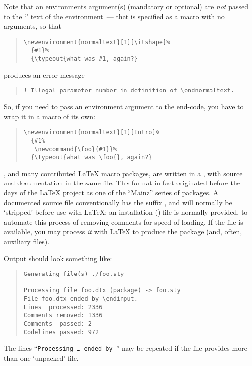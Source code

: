 Note that an environments argument(s) (mandatory or optional) are
\emph{not} passed to the `' text of the environment~--- that
is specified as a macro with no arguments, so that
\begin{quote}
\begin{verbatim}
\newenvironment{normaltext}[1][\itshape]%
  {#1}%
  {\typeout{what was #1, again?}
\end{verbatim}
\end{quote}
produces an error message
\begin{quote}
\begin{verbatim}
! Illegal parameter number in definition of \endnormaltext.
\end{verbatim}
\end{quote}
So, if you need to pass an environment argument to the end-code, you
have to wrap it in a macro of its own:
\begin{quote}
\begin{verbatim}
\newenvironment{normaltext}[1][Intro]%
  {#1%
   \newcommand{\foo}{#1}}%
  {\typeout{what was \foo{}, again?}
\end{verbatim}
\end{quote}


\LaTeXe{}, and many contributed \LaTeX{} macro packages, are written
in a , with source and
documentation in the
same file.  This format in fact originated before the
days of the \LaTeX{} project as one of the ``Mainz'' series of
packages.  A documented source file conventionally has the suffix
, and will normally be `stripped' before use with
\LaTeX{}; an installation () file is normally provided,
to automate this process of removing comments for speed of loading.
If the  file is available, you may process \emph{it}
with \LaTeX{} to produce the package (and, often, auxiliary files).

Output should look something like:
\begin{quote}
\begin{verbatim}
Generating file(s) ./foo.sty 

Processing file foo.dtx (package) -> foo.sty
File foo.dtx ended by \endinput.
Lines  processed: 2336
Comments removed: 1336
Comments  passed: 2
Codelines passed: 972
\end{verbatim}
\end{quote}
The lines ``\texttt{Processing \dots{}\ ended by }'' may
be repeated if the  file provides more than one
`unpacked' file.

